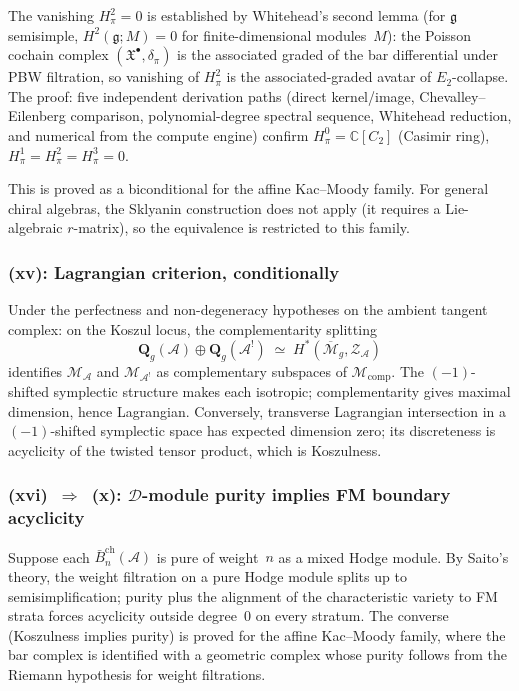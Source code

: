 \documentclass[11pt,reqno]{amsart}
\theoremstyle{definition}
\theoremstyle{remark}
\newcommand{\cA}{\mathcal{A}}
\newcommand{\cD}{\mathcal{D}}
\newcommand{\cM}{\mathcal{M}}
\newcommand{\cZ}{\mathcal{Z}}
\newcommand{\barBch}{\bar{B}^{\mathrm{ch}}}
\newcommand{\fg}{\mathfrak{g}}
\newcommand{\bC}{\mathbb{C}}
\newcommand{\Etwo}{E_2}
\numberwithin{equation}{section}
\begin{document}
The vanishing $H^2_\pi = 0$ is established by Whitehead's second
lemma (for $\fg$ semisimple, $H^2(\fg; M) = 0$ for finite-dimensional
modules~$M$): the Poisson cochain complex
$(\mathfrak{X}^\bullet, \delta_\pi)$ is the associated graded of
the bar differential under PBW filtration, so vanishing of $H^2_\pi$
is the associated-graded avatar of $\Etwo$-collapse.
The proof: five independent derivation paths (direct kernel/image,
Chevalley--Eilenberg comparison, polynomial-degree spectral sequence,
Whitehead reduction, and numerical from the compute engine) confirm
$H^0_\pi = \bC[C_2]$ (Casimir ring),
$H^1_\pi = H^2_\pi = H^3_\pi = 0$.

This is proved as a biconditional for the affine Kac--Moody family.
For general chiral algebras, the Sklyanin construction does not
apply (it requires a Lie-algebraic $r$-matrix), so the equivalence is
restricted to this family.

\subsubsection*{\textup{(xv):}
Lagrangian criterion, conditionally}

Under the perfectness and non-degeneracy hypotheses on the ambient
tangent complex: on the Koszul locus, the complementarity splitting
\[
\mathbf{Q}_g(\cA) \oplus \mathbf{Q}_g(\cA^!)
 \;\simeq\; H^*(\overline{\cM}_g, \cZ_\cA)
\]
identifies $\cM_\cA$ and $\cM_{\cA^!}$ as complementary subspaces
of $\cM_{\mathrm{comp}}$. The $(-1)$-shifted symplectic structure
makes each isotropic; complementarity gives maximal dimension,
hence Lagrangian. Conversely, transverse Lagrangian intersection
in a $(-1)$-shifted symplectic space has expected dimension zero;
its discreteness is acyclicity of the twisted tensor product,
which is Koszulness.

\subsubsection*{\textup{(xvi)}~$\Rightarrow$~\textup{(x):}
$\cD$-module purity implies FM boundary acyclicity}

Suppose each $\barBch_n(\cA)$ is pure of weight~$n$ as a mixed
Hodge module. By Saito's theory, the weight filtration on a pure
Hodge module splits up to semisimplification; purity plus the
alignment of the characteristic variety to FM strata forces
acyclicity outside degree~$0$ on every stratum. The converse
(Koszulness implies purity) is proved for the affine Kac--Moody
family, where the bar complex is identified with a geometric
complex whose purity follows from the Riemann hypothesis for
weight filtrations.
\end{document}
